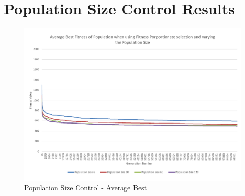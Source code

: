 
\section{Population Size Control Results} %
\label{sec:population_size_control_results}

\begin{landscape}
\begin{figure}[thbp]
	\centerline{\includegraphics[height=0.945\textwidth]{figures/CircleTests/PopulationSizeControl/CirclePopulationSizeControllAverageBest.pdf}}
	\caption{Population Size Control - Average Best}
	\label{fig:cpscab}
\end{figure}
\end{landscape}

